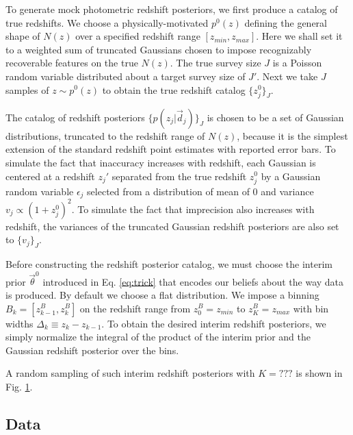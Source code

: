 \documentclass[preprint]{aastex}
\begin{document}
To generate mock photometric redshift posteriors, we first produce a catalog of 
true redshifts.  We choose a physically-motivated $p^{0}(z)$ defining the 
general shape of $N(z)$ over a specified redshift range $[z_{min},z_{max}]$.  
Here we shall set it to a weighted sum of truncated Gaussians chosen to impose 
recognizably recoverable features on the true $N(z)$.  The true survey size $J$ 
is a Poisson random variable distributed about a target survey size of $J'$.  
Next we take $J$ samples of $z\sim p^{0}(z)$ to obtain the true redshift 
catalog $\{z_{j}^{0}\}_{J}$.  

The catalog of redshift posteriors $\{p(z_{j}|\vec{d}_{j})\}_{J}$ is chosen to 
be a set of Gaussian distributions, truncated to the redshift range of $N(z)$, 
because it is the simplest extension of the standard redshift point estimates 
with reported error bars.  To simulate the fact that inaccuracy increases with 
redshift, each Gaussian is centered at a redshift $z_{j}'$ separated from the 
true redshift $z_{j}^{0}$ by a Gaussian random variable $\epsilon_{j}$ selected 
from a distribution of mean of 0 and variance $v_{j}\propto(1+z_{j}^{0})^{2}$.  
To simulate the fact that imprecision also increases with redshift, the 
variances of the truncated Gaussian redshift posteriors are also set to 
$\{v_{j}\}_{J}$.

Before constructing the redshift posterior catalog, we must choose the interim 
prior $\vec{\theta}^{0}$ introduced in Eq. \ref{eq:trick} that encodes our 
beliefs about the way data is produced.  By default we choose a flat 
distribution. We impose a binning $B_{k}=[z^{B}_{k-1},z^{B}_{k}]$ on the 
redshift range from $z^{B}_{0}=z_{min}$ to $z^{B}_{K}=z_{max}$ with bin widths 
$\Delta_{k}\equiv z_{k}-z_{k-1}$.  To obtain the desired interim redshift 
posteriors, we simply normalize the integral of the product of the interim 
prior and the Gaussian redshift posterior over the bins.  

A random sampling of such interim redshift posteriors with $K=???$ is shown in 
Fig. \ref{fig:nullpzs}.

\begin{figure}
\caption{}
\label{fig:nullpzs}
\end{figure}

\clearpage
\subsection{Data}
\label{sec:data}
\end{document}

